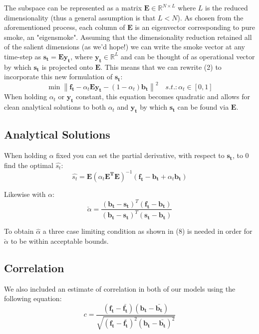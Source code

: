 \documentclass[12pt]{article}
\begin{document}
The subspace can be represented as a matrix $\boldsymbol{E} \in \mathbb{R}^{N\times L}$ where $L$ is the reduced dimensionality (thus a general assumption is that $L < N$). As chosen from the aforementioned process, each column of $\boldsymbol{E}$ is an eigenvector corresponding to pure smoke, an "eigensmoke". Assuming that the dimensionality reduction retained all of the salient dimensions (as we'd hope!) we can write the smoke vector at any time-step as $\boldsymbol{s_t} = \boldsymbol{Ey_t}$, where $\boldsymbol{y_t} \in \mathbb{R}^L$ and can be thought of as operational vector by which $\boldsymbol{s_t}$ is projected onto $\boldsymbol{E}$. This means that we can rewrite (2) to incorporate this new formulation of $\boldsymbol{s_t}$:
\begin{equation}
\min\left \|   \boldsymbol{f_{t}} - \alpha_{t} \boldsymbol{Ey_t} - (1-\alpha_{t} )\boldsymbol{\mathbf{b}_{t}}\right \|^2 
\quad
 s.t. :   \alpha_{t} \in \left [ 0 ,1 \right ]
\end{equation}
When holding $\alpha_t$ or $\boldsymbol{y_t}$ constant, this equation becomes quadratic and allows for clean analytical solutions to both $\alpha_t$ and $\boldsymbol{y_t}$ by which $\boldsymbol{s_t}$ can be found via $\boldsymbol{E}$.

\subsection{Analytical Solutions}
When holding $\alpha$ fixed you can set the partial derivative, with respect to $\boldsymbol{s_t}$, to 0 find the optimal $\hat{s_t}$:  
\begin{equation}
\hat{s_t} = \boldsymbol{E}(\alpha_t\boldsymbol{E^TE})^{-1} (\boldsymbol{f_t}-\boldsymbol{b_t} +\alpha_t\boldsymbol{b_t})
\end{equation}

Likewise with $\alpha$: 
\begin{equation}
\breve{\alpha }= \frac{(\boldsymbol{b_t-s_t})^T(\boldsymbol{f_t-b_t})}{(\boldsymbol{b_t-s_t})^T(\boldsymbol{s_t-b_t})}
\end{equation}

To obtain $\hat{\alpha }$ a three case limiting condition as shown in (8) is needed in order for $\breve{\alpha}$ to be within acceptable bounds.   

\subsection{Correlation}
We also included an estimate of correlation in both of our models using the following equation: 
\begin{equation}
c = \frac{(\boldsymbol{f_t}-\bar{\boldsymbol{f_t}})(\boldsymbol{b_t}-\bar{\boldsymbol{b_t}})}{\sqrt{(\boldsymbol{f_t}-\bar{\boldsymbol{f_t}})^2(\boldsymbol{b_t}-\bar{\boldsymbol{b_t}})^2}}
\end{equation}
\end{document}

